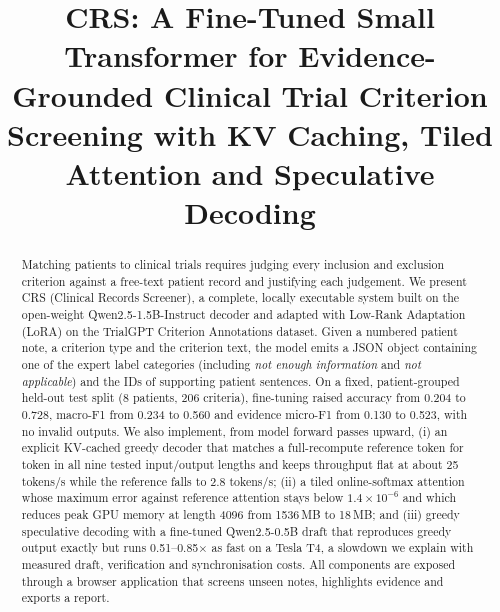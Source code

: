\documentclass[conference]{IEEEtran}
\begin{document}
\title{CRS: A Fine-Tuned Small Transformer for Evidence-Grounded Clinical Trial Criterion Screening with KV Caching, Tiled Attention and Speculative Decoding}

\author{
}

\maketitle

\begin{abstract}
Matching patients to clinical trials requires judging every inclusion and exclusion criterion against a free-text patient record and justifying each judgement. We present CRS (Clinical Records Screener), a complete, locally executable system built on the open-weight Qwen2.5-1.5B-Instruct decoder and adapted with Low-Rank Adaptation (LoRA) on the TrialGPT Criterion Annotations dataset. Given a numbered patient note, a criterion type and the criterion text, the model emits a JSON object containing one of the expert label categories (including \emph{not enough information} and \emph{not applicable}) and the IDs of supporting patient sentences. On a fixed, patient-grouped held-out test split (8 patients, 206 criteria), fine-tuning raised accuracy from 0.204 to 0.728, macro-F1 from 0.234 to 0.560 and evidence micro-F1 from 0.130 to 0.523, with no invalid outputs. We also implement, from model forward passes upward, (i) an explicit KV-cached greedy decoder that matches a full-recompute reference token for token in all nine tested input/output lengths and keeps throughput flat at about 25 tokens/s while the reference falls to 2.8 tokens/s; (ii) a tiled online-softmax attention whose maximum error against reference attention stays below $1.4\times10^{-6}$ and which reduces peak GPU memory at length 4096 from 1536\,MB to 18\,MB; and (iii) greedy speculative decoding with a fine-tuned Qwen2.5-0.5B draft that reproduces greedy output exactly but runs 0.51--0.85$\times$ as fast on a Tesla T4, a slowdown we explain with measured draft, verification and synchronisation costs. All components are exposed through a browser application that screens unseen notes, highlights evidence and exports a report.
\end{abstract}
\end{document}

